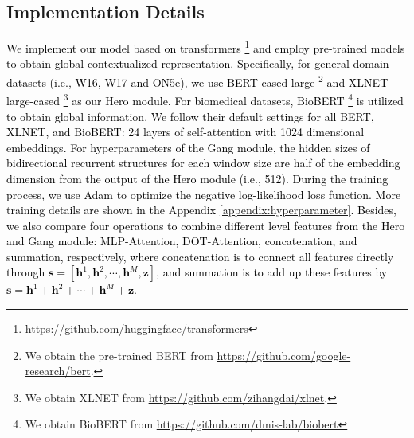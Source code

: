 \documentclass[11pt]{article}
\begin{document}
\subsection{Implementation Details}
\textcolor{black}{
We implement our model based on transformers \cite{wolf2020transformers}\footnote{\url{https://github.com/huggingface/transformers}} and employ pre-trained models to obtain global contextualized representation.
Specifically, for general domain datasets (i.e., W16, W17 and ON5e), we use BERT-cased-large \cite{BERT}\footnote{We obtain the pre-trained BERT from \url{https://github.com/google-research/bert}.} and XLNET-large-cased \cite{yangxlnet}\footnote{We obtain XLNET from \url{https://github.com/zihangdai/xlnet}.} as our Hero module.
For biomedical datasets, BioBERT \cite{biobert}\footnote{We obtain BioBERT from \url{https://github.com/dmis-lab/biobert}} is utilized to obtain global information.
}
\textcolor{black}{
We follow their default settings for all BERT, XLNET, and BioBERT: 24 layers of self-attention with 1024 dimensional embeddings.
For hyperparameters of the Gang module, the hidden sizes of bidirectional recurrent structures for each window size are half of the embedding dimension from the output of the Hero module (i.e., 512).
During the training process, we use Adam \cite{adam} to optimize the negative log-likelihood loss function.
More training details are shown in the Appendix \ref{appendix:hyperparameter}.
Besides, we also compare four operations to combine different level features from the Hero and Gang module: MLP-Attention, DOT-Attention, concatenation, and summation, respectively, where concatenation is to connect all features directly through $\mathbf{s} = [\mathbf{h}^{1}, \mathbf{h}^{2},\cdots, \mathbf{h}^{M},\mathbf{z}]$,  and summation is to add up these features by $\mathbf{s} = \mathbf{h}^{1}+\mathbf{h}^{2}+\cdots+\mathbf{h}^{M}+\mathbf{z}$.
}
\end{document}
